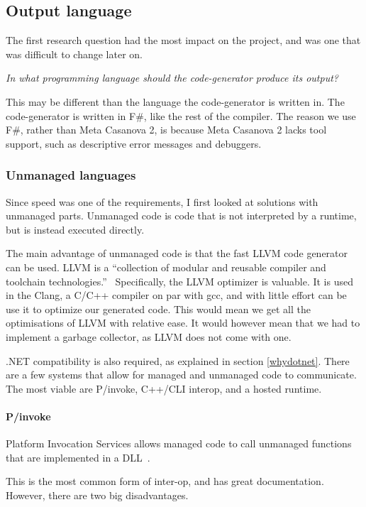 \subsection{Output language}
The first research question had the most impact on the project, and was one that was difficult to change later on.

\textit{In what programming language should the code-generator produce its output?}

This may be different than the language the code-generator is written in.
The code-generator is written in F\#, like the rest of the compiler.
The reason we use F\#, rather than Meta Casanova 2, is because Meta Casanova 2 lacks tool support, such as descriptive error messages and debuggers.

\subsubsection{Unmanaged languages}
Since speed was one of the requirements, I first looked at solutions with unmanaged parts.
Unmanaged code is code that is not interpreted by a runtime, but is instead executed directly.

The main advantage of unmanaged code is that the fast LLVM code generator can be used.
LLVM is a ``collection of modular and reusable compiler and toolchain technologies.''~\cite{llvm}
Specifically, the LLVM optimizer is valuable.
It is used in the Clang, a C/C++ compiler on par with gcc, and with little effort can be use it to optimize our generated code.
This would mean we get all the optimisations of LLVM with relative ease.
It would however mean that we had to implement a garbage collector, as LLVM does not come with one.
 
.NET compatibility is also required, as explained in section \ref{whydotnet}.
There are a few systems that allow for managed and unmanaged code to communicate.
The most viable are P/invoke, C++/CLI interop, and a hosted runtime.

\paragraph{P/invoke}
Platform Invocation Services allows managed code to call unmanaged functions that are implemented in a DLL~\cite{msdn_pinvoke}.

This is the most common form of inter-op, and has great documentation.
However, there are two big disadvantages.

